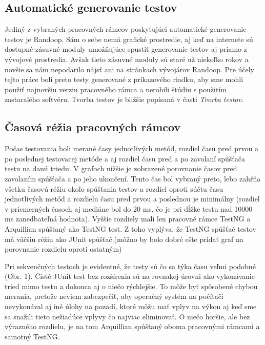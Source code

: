 \documentclass[11pt,twoside,slovak,a4paper]{article}
\begin{document}
	\subsection{Automatické generovanie testov}
	Jediný z vybraných pracovných rámcov poskytujúci automatické generovanie testov je Randoop. Sám o sebe nemá grafické prostredie, aj keď na internete sú dostupné zásuvné moduly umožňujúce spustiť generovanie testov aj priamo z vývojové prostredia. Avšak tieto zásuvné moduly sú staré už niekoľko rokov a novšie sa nám nepodarilo nájsť ani na stránkach vývojárov Randoop. Pre účely tejto práce boli preto testy generované z príkazového riadku, aby sme mohli použiť najnovšiu verziu pracovného rámca a nerobili štúdiu s použitím zastaralého softvéru. Tvorba testov je bližšie popísaná v časti \textit{Tvorba testov}.	
	
	\subsection{Časová réžia pracovných rámcov}
	Počas testovania boli merané časy jednotlivých metód, rozdiel času pred prvou a po poslednej testovacej metóde a aj rozdiel času pred a po zavolaní spúšťača testu na danú triedu. V grafoch nižšie je zobrazené porovnanie časov pred zavolaním spúšťača a po jeho ukončení. Tento čas bol vybraný preto, lebo zahŕňa všetku časovú réžiu okolo spúšťania testov a rozdiel oproti súčtu času jednotlivých metód a rozdielu času pred prvou a poslednou je minimálny (rozdiel v priemerných časoch aj mediáne bol do 20 ms, čo je pri dĺžke testu nad 10000 ms zanedbateľná hodnota). Vyššie rozdiely mali len pracovné rámce TestNG a Arquillian spúšťaný ako TestNG test. Z toho vyplýva, že TestNG spúšťač testov má väčšiu réžiu ako JUnit spúšťač.(môžno by bolo dobré ešte pridať graf na porovnanie rozdielu oproti ostatným)
	
	Pri sekvenčných testoch je evidentné, že testy sú čo sa týka času veľmi podobné (Obr. 1). Čisté JUnit test bez rozšírenia sú na rovnakej úrovni ako vykonávanie tried mimo testu a dokonca aj o niečo rýchlejšie. To môže byť spôsobené chybou merania, pretože neviem zabezpečiť, aby operačný systém na počítači nevykonával aj iné úlohy na pozadí, ktoré môžu mať vplyv na výkon aj keď sme sa snažili tieto nežiadúce vplyvy čo najviac eliminovať. O niečo horšie, ale bez výrazného rozdielu, je na tom Arquillian spúšťaný oboma pracovnými rámcami a samotný TestNG.
	
\end{document}
